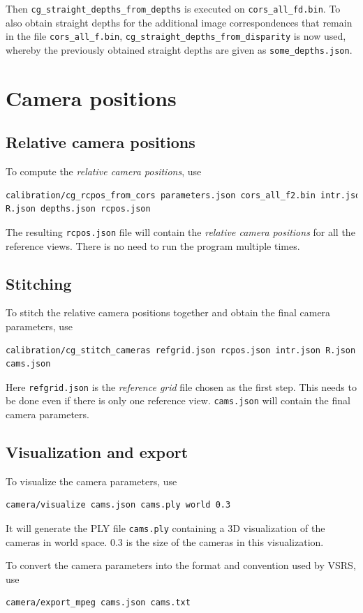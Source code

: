 \documentclass[11pt]{scrreprt}
\begin{document}
Then \texttt{cg\_straight\_depths\_from\_depths} is executed on \texttt{cors\_all\_fd.bin}. To also obtain straight depths for the additional image correspondences that remain in the file \texttt{cors\_all\_f.bin}, \texttt{cg\_straight\_depths\_from\_disparity} is now used, whereby the previously obtained straight depths are given as \texttt{some\_depths.json}. 



\section{Camera positions}
\subsection{Relative camera positions}
To compute the \emph{relative camera positions}, use
\begin{lstlisting}[language=bash]
calibration/cg_rcpos_from_cors parameters.json cors_all_f2.bin intr.json
R.json depths.json rcpos.json
\end{lstlisting}

\noindent The resulting \texttt{rcpos.json} file will contain the \emph{relative camera positions} for all the reference views. There is no need to run the program multiple times.

\subsection{Stitching}
To stitch the relative camera positions together and obtain the final camera parameters, use
\begin{lstlisting}[language=bash]
calibration/cg_stitch_cameras refgrid.json rcpos.json intr.json R.json
cams.json
\end{lstlisting}

\noindent Here \texttt{refgrid.json} is the \emph{reference grid} file chosen as the first step. This needs to be done even if there is only one reference view. \texttt{cams.json} will contain the final camera parameters.


\subsection{Visualization and export}
To visualize the camera parameters, use
\begin{lstlisting}[language=bash]
camera/visualize cams.json cams.ply world 0.3
\end{lstlisting}

\noindent It will generate the PLY file \texttt{cams.ply} containing a 3D visualization of the cameras in world space. $0.3$ is the size of the cameras in this visualization.

To convert the camera parameters into the format and convention used by VSRS, use
\begin{lstlisting}[language=bash]
camera/export_mpeg cams.json cams.txt
\end{lstlisting}
\end{document}
